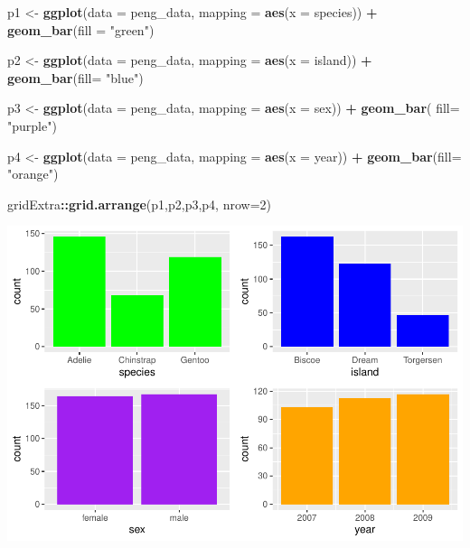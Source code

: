 \documentclass[
]{article}
\newenvironment{Shaded}{\begin{snugshade}}{\end{snugshade}}
\newcommand{\AttributeTok}[1]{\textcolor[rgb]{0.13,0.29,0.53}{#1}}
\newcommand{\DecValTok}[1]{\textcolor[rgb]{0.00,0.00,0.81}{#1}}
\newcommand{\FunctionTok}[1]{\textcolor[rgb]{0.13,0.29,0.53}{\textbf{#1}}}
\newcommand{\NormalTok}[1]{#1}
\newcommand{\OtherTok}[1]{\textcolor[rgb]{0.56,0.35,0.01}{#1}}
\newcommand{\SpecialCharTok}[1]{\textcolor[rgb]{0.81,0.36,0.00}{\textbf{#1}}}
\newcommand{\StringTok}[1]{\textcolor[rgb]{0.31,0.60,0.02}{#1}}
\begin{document}
\begin{Shaded}
\begin{Highlighting}[]
\NormalTok{p1 }\OtherTok{\textless{}{-}} \FunctionTok{ggplot}\NormalTok{(}\AttributeTok{data =}\NormalTok{ peng\_data, }\AttributeTok{mapping =} \FunctionTok{aes}\NormalTok{(}\AttributeTok{x =}\NormalTok{ species)) }\SpecialCharTok{+} 
  \FunctionTok{geom\_bar}\NormalTok{(}\AttributeTok{fill =}  \StringTok{"green"}\NormalTok{)}

\NormalTok{p2 }\OtherTok{\textless{}{-}} \FunctionTok{ggplot}\NormalTok{(}\AttributeTok{data =}\NormalTok{ peng\_data, }\AttributeTok{mapping =} \FunctionTok{aes}\NormalTok{(}\AttributeTok{x =}\NormalTok{ island)) }\SpecialCharTok{+} 
  \FunctionTok{geom\_bar}\NormalTok{(}\AttributeTok{fill=} \StringTok{"blue"}\NormalTok{)}

\NormalTok{p3 }\OtherTok{\textless{}{-}} \FunctionTok{ggplot}\NormalTok{(}\AttributeTok{data =}\NormalTok{ peng\_data, }\AttributeTok{mapping =} \FunctionTok{aes}\NormalTok{(}\AttributeTok{x =}\NormalTok{ sex)) }\SpecialCharTok{+} 
  \FunctionTok{geom\_bar}\NormalTok{( }\AttributeTok{fill=} \StringTok{"purple"}\NormalTok{)}

\NormalTok{p4 }\OtherTok{\textless{}{-}} \FunctionTok{ggplot}\NormalTok{(}\AttributeTok{data =}\NormalTok{ peng\_data, }\AttributeTok{mapping =} \FunctionTok{aes}\NormalTok{(}\AttributeTok{x =}\NormalTok{ year)) }\SpecialCharTok{+} 
  \FunctionTok{geom\_bar}\NormalTok{(}\AttributeTok{fill=} \StringTok{"orange"}\NormalTok{)}

\NormalTok{gridExtra}\SpecialCharTok{::}\FunctionTok{grid.arrange}\NormalTok{(p1,p2,p3,p4, }\AttributeTok{nrow=}\DecValTok{2}\NormalTok{)}
\end{Highlighting}
\end{Shaded}

\includegraphics{EDA_files/figure-latex/unnamed-chunk-27-1.pdf}
\end{document}
